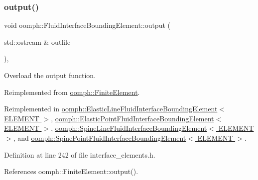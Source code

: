 \mbox{\label{classoomph_1_1FluidInterfaceBoundingElement_a81adc5ae89ddfa120f587c61b972622f}} 
\subsubsection{\texorpdfstring{output()}{output()}\hspace{0.1cm}{\footnotesize\ttfamily [1/4]}}
{\footnotesize\ttfamily void oomph\+::\+Fluid\+Interface\+Bounding\+Element\+::output (\begin{DoxyParamCaption}\item[{std\+::ostream \&}]{outfile }\end{DoxyParamCaption})\hspace{0.3cm}{\ttfamily [inline]}, {\ttfamily [virtual]}}



Overload the output function. 



Reimplemented from \hyperlink{classoomph_1_1FiniteElement_a2ad98a3d2ef4999f1bef62c0ff13f2a7}{oomph\+::\+Finite\+Element}.



Reimplemented in \hyperlink{classoomph_1_1ElasticLineFluidInterfaceBoundingElement_a50444fef924185e8d462238045e24543}{oomph\+::\+Elastic\+Line\+Fluid\+Interface\+Bounding\+Element$<$ E\+L\+E\+M\+E\+N\+T $>$}, \hyperlink{classoomph_1_1ElasticPointFluidInterfaceBoundingElement_a3a09e94ba3bf5ce0922bc4b75097078c}{oomph\+::\+Elastic\+Point\+Fluid\+Interface\+Bounding\+Element$<$ E\+L\+E\+M\+E\+N\+T $>$}, \hyperlink{classoomph_1_1SpineLineFluidInterfaceBoundingElement_a5c074690d693fa7fb349b22e926064b4}{oomph\+::\+Spine\+Line\+Fluid\+Interface\+Bounding\+Element$<$ E\+L\+E\+M\+E\+N\+T $>$}, and \hyperlink{classoomph_1_1SpinePointFluidInterfaceBoundingElement_ac35833173407cde9359c8163a0eba35c}{oomph\+::\+Spine\+Point\+Fluid\+Interface\+Bounding\+Element$<$ E\+L\+E\+M\+E\+N\+T $>$}.



Definition at line 242 of file interface\+\_\+elements.\+h.



References oomph\+::\+Finite\+Element\+::output().



